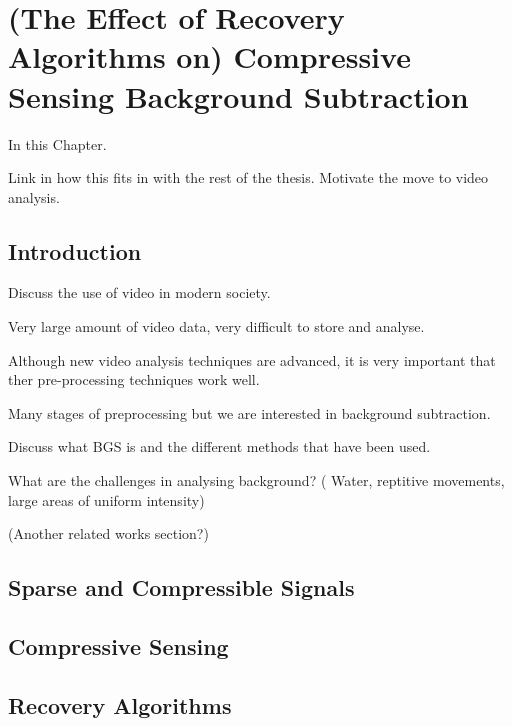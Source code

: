 %							

%								

\graphicspath{{Chapter4/figures/}}

\chapter{(The Effect of Recovery Algorithms on) Compressive Sensing Background Subtraction}

In this Chapter.

Link in how this fits in with the rest of the thesis. 
Motivate the move to video analysis. 

\section{Introduction}
\label{sec:4intro}

Discuss the use of video in modern society. 

Very large amount of video data, very difficult to store and analyse. 

Although new video analysis techniques are advanced, it is very important that ther pre-processing techniques work well. 

Many stages of preprocessing but we are interested in background subtraction. 

Discuss what BGS is and the different methods that have been used. 

What are the challenges in analysing background? ( Water, reptitive movements, large areas of uniform intensity)

(Another related works section?)


\section{Sparse and Compressible Signals}
\label{sec:sparse}


\section{Compressive Sensing}
\label{sec:cs}


\section{Recovery Algorithms}
\label{sec:ra}

